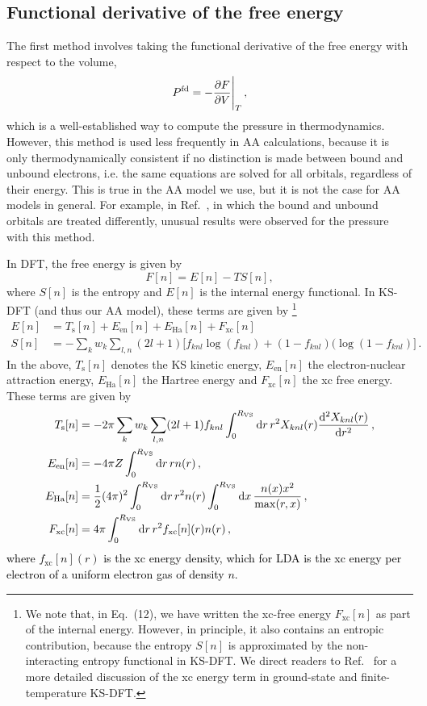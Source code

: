 \documentclass[%
 preprint,
 superscriptaddress,
 amsmath,amssymb,
longbibliography,
]{revtex4-2}
\newcommand{\change}[1]{\textcolor{black}{#1}}
\newcommand{\RVS}{R_\textrm{VS}}
\newcommand{\Pfd}{P^\textrm{fd}}
\begin{document}
\subsection{Functional derivative of the free energy} \label{sec:P_fd}

The first method involves taking the functional derivative of the free energy with respect to the volume,
\begin{equation}\label{eq:P_fd}
   \Pfd = -\pdv{F}{V}\Bigg|_T\,,
\end{equation}
which is a well-established way to compute the pressure in thermodynamics. However, this method is used less frequently in AA calculations, because it is only thermodynamically consistent if no distinction is made between bound and unbound electrons, i.e. the same equations are solved for all orbitals, regardless of their energy. This is true in the AA model we use, but it is not the case for AA models in general. For example, in Ref.~\cite{Callow_AA_22}, in which the bound and unbound orbitals are treated differently, unusual results were observed for the pressure with this method.

In DFT, the free energy is given by
\begin{equation}
    F[n] = E[n] - T S[n],
\end{equation}
where $S[n]$ is the entropy and $E[n]$ is the internal energy functional. In KS-DFT (and thus our AA model), these terms are given by \footnote{We note that, in Eq.~(12), we have written the xc-free energy $F_\textrm{xc}[n]$ as part of the internal energy. However, in principle, it also contains an entropic contribution, because the entropy $S[n]$ is approximated by the non-interacting entropy functional in KS-DFT. We direct readers to Ref.~\cite{Callow_AA_22} for a more detailed discussion of the xc energy term in ground-state and finite-temperature KS-DFT.}
\begin{align} \label{eq:E_internal}
    E[n] &= T_\textrm{s}[n] + E_\textrm{en}[n] + E_\textrm{Ha}[n] + F_\textrm{xc}[n]\\
    S[n] &= -\sum_{k}w_k\sum_{l,n} (2l+1) \big[ f_{knl}\log(f_{knl}) + (1-f_{knl}) (\log(1-f_{knl}) \big]\,.
\end{align}
In the above, $T_\textrm{s}[n]$ denotes the KS kinetic energy, $E_\textrm{en}[n]$ the electron-nuclear attraction energy, $E_\textrm{Ha}[n]$ the Hartree energy and $F_\textrm{xc}[n]$ the xc free energy. These terms are given by
\begin{align} \label{eq:T_KS}
      T_\textrm{s}[n] &= - 2\pi  \sum_k w_k \sum_{l,n} (2l+1) f_{knl} \int_0^{\RVS} \dd{r} r^2 \rnl \dv[2]{\rnl}{r}\,,\\
        E_\textrm{en}[n] &= -4 \pi Z \int_0^{\RVS} \dd{r} r n(r)\,, \\
     E_\textrm{Ha}[n]&= \frac{1}{2}(4\pi)^2 \int_0^{\RVS} \dd{r} r^2 n(r)\int_0^{\RVS} \dd{x} \frac{n(x)x^2}{\max(r,x)}\,,\\
     F_\textrm{xc}[n] &= 4\pi  \int_0^{\RVS} \dd{r} r^2 f_\textrm{xc}[n](r)n(r)\,,   
\end{align}
\change{where $f_\textrm{xc}[n](r)$ is the xc energy density, which for LDA is the xc energy per electron of a uniform electron gas of density $n$.}
\end{document}
